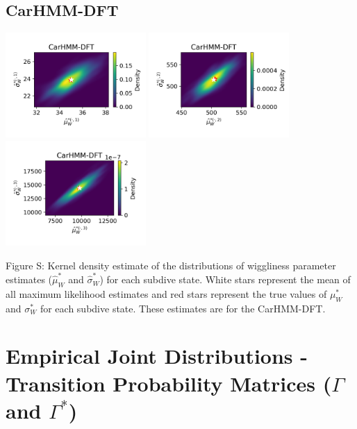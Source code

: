 \documentclass{article}
\begin{document}
        \subsection{CarHMM-DFT}
        \begin{center}
        \includegraphics[width=2.1in]{../Plots/hmm_FV_MLE_density_FoVeDBA_0_0.png}
        \includegraphics[width=2.1in]{../Plots/hmm_FV_MLE_density_FoVeDBA_0_1.png}
        \includegraphics[width=2.1in]{../Plots/hmm_FV_MLE_density_FoVeDBA_0_2.png}
        \end{center}
        
        \noindent Figure S: Kernel density estimate of the distributions of wiggliness parameter estimates ($\hat \mu^*_W$ and $\hat \sigma^*_W$) for each subdive state. White stars represent the mean of all maximum likelihood estimates and red stars represent the true values of $\mu^*_W$ and $\sigma^*_W$ for each subdive state. These estimates are for the CarHMM-DFT.
        \addtocounter{fignum}{1}
        
    \newpage
    \section{Empirical Joint Distributions - Transition Probability Matrices ($\Gamma$ and $\Gamma^*$)}
        
\end{document}
